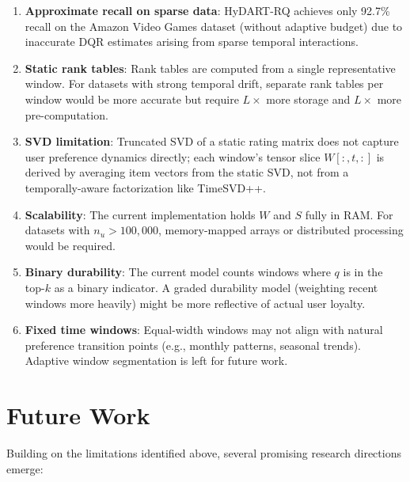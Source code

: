 \begin{enumerate}
  \item \textbf{Approximate recall on sparse data}: HyDART-RQ achieves only 92.7\% recall on the Amazon Video Games dataset (without adaptive budget) due to inaccurate DQR estimates arising from sparse temporal interactions.
  \item \textbf{Static rank tables}: Rank tables are computed from a single representative window. For datasets with strong temporal drift, separate rank tables per window would be more accurate but require $L\times$ more storage and $L\times$ more pre-computation.
  \item \textbf{SVD limitation}: Truncated SVD of a static rating matrix does not capture user preference dynamics directly; each window's tensor slice $W[:,t,:]$ is derived by averaging item vectors from the static SVD, not from a temporally-aware factorization like TimeSVD++.
  \item \textbf{Scalability}: The current implementation holds $W$ and $S$ fully in RAM. For datasets with $n_u > 100{,}000$, memory-mapped arrays or distributed processing would be required.
  \item \textbf{Binary durability}: The current model counts windows where $q$ is in the top-$k$ as a binary indicator. A graded durability model (weighting recent windows more heavily) might be more reflective of actual user loyalty.
  \item \textbf{Fixed time windows}: Equal-width windows may not align with natural preference transition points (e.g., monthly patterns, seasonal trends). Adaptive window segmentation is left for future work.
\end{enumerate}

\section{Future Work}

Building on the limitations identified above, several promising research directions emerge:

